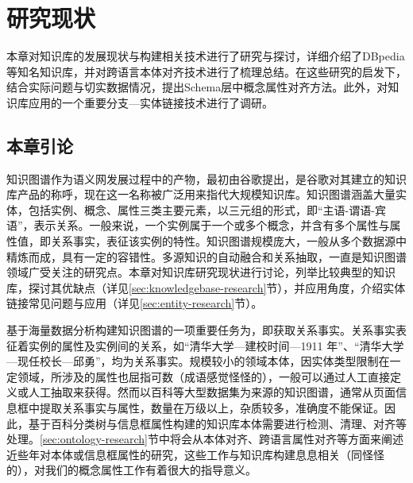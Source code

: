 \chapter{研究现状}
\label{cha:research}
本章对知识库的发展现状与构建相关技术进行了研究与探讨，详细介绍了DBpedia等知名知识库，并对跨语言本体对齐技术进行了梳理总结。在这些研究的启发下，结合实际问题与切实数据情况，提出Schema层中概念属性对齐方法。此外，对知识库应用的一个重要分支—实体链接技术进行了调研。

\section{本章引论}

知识图谱作为语义网发展过程中的产物，最初由谷歌提出，是谷歌对其建立的知识库产品的称呼，现在这一名称被广泛用来指代大规模知识库。知识图谱涵盖大量实体，包括实例、概念、属性三类主要元素，以三元组的形式，即“主语-谓语-宾语”，表示关系。一般来说，一个实例属于一个或多个概念，并含有多个属性与属性值，即关系事实，表征该实例的特性。知识图谱规模庞大，一般从多个数据源中精炼而成，具有一定的容错性。多源知识的自动融合和关系抽取，一直是知识图谱领域广受关注的研究点。本章对知识库研究现状进行讨论，列举比较典型的知识库，探讨其优缺点（详见\ref{sec:knowledgebase-research}节），并应用角度，介绍实体链接常见问题与应用（详见\ref{sec:entity-research}节）。

基于海量数据分析构建知识图谱的一项重要任务为，即获取关系事实\cite{suchanek2014knowledge}。关系事实表征着实例的属性及实例间的关系，如“清华大学—建校时间—1911 年”、“清华大学—现任校长—邱勇”，均为关系事实。规模较小的领域本体，因实体类型限制在一定领域，所涉及的属性也屈指可数（成语感觉怪怪的），一般可以通过人工直接定义\cite{boyce2007developing}或人工抽取\cite{wang:movie}来获得。然而以百科等大型数据集为来源的知识图谱，通常从页面信息框中提取关系事实与属性，数量在万级以上，杂质较多，准确度不能保证。因此，基于百科分类树与信息框属性构建的知识库本体需要进行检测、清理、对齐等处理。\ref{sec:ontology-research}节中将会从本体对齐、跨语言属性对齐等方面来阐述近些年对本体或信息框属性的研究，这些工作与知识库构建息息相关（同怪怪的），对我们的概念属性工作有着很大的指导意义。


